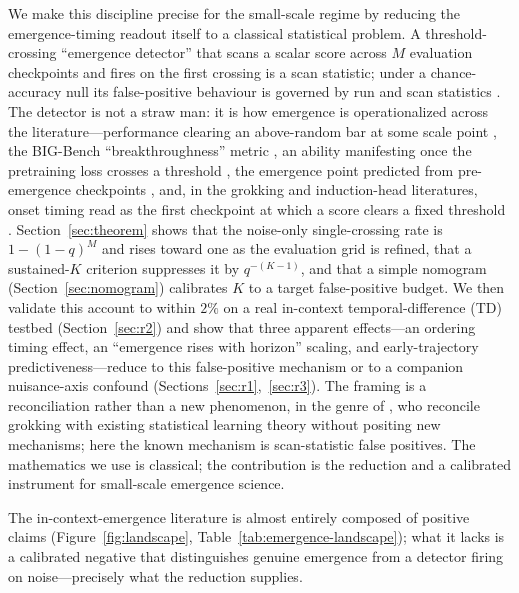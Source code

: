 \documentclass[11pt]{article}
\theoremstyle{plain}
\theoremstyle{definition}
\begin{document}
We make this discipline precise for the small-scale regime by reducing the
emergence-timing readout itself to a classical statistical problem. A threshold-crossing
``emergence detector'' that scans a scalar score across $M$ evaluation checkpoints and
fires on the first crossing is a scan statistic; under a chance-accuracy null its
false-positive behaviour is governed by run and scan statistics
\citep{feller1968,glaz2001scan,fulou2003runs}. The detector is not a straw man: it is how
emergence is operationalized across the literature---performance clearing an above-random
bar at some scale point \citep{wei2022emergent}, the BIG-Bench ``breakthroughness''
metric \citep{srivastava2022bigbench}, an ability manifesting once the pretraining loss
crosses a threshold \citep{du2024loss}, the emergence point predicted from pre-emergence
checkpoints \citep{snell2024predicting}, and, in the grokking and induction-head
literatures, onset timing read as the first checkpoint at which a score clears a fixed
threshold \citep{power2022grokking,olsson2022induction}. Section~\ref{sec:theorem} shows that the
noise-only single-crossing rate is $1-(1-q)^{M}$ and rises toward one as the evaluation
grid is refined, that a sustained-$K$ criterion suppresses it by $q^{-(K-1)}$, and that a
simple nomogram (Section~\ref{sec:nomogram}) calibrates $K$ to a target false-positive
budget. We then validate this account to within $2\%$ on a real in-context
temporal-difference (TD) testbed (Section~\ref{sec:r2}) and show that three apparent
effects---an ordering timing effect, an ``emergence rises with horizon'' scaling, and
early-trajectory predictiveness---reduce to this false-positive mechanism or to a companion
nuisance-axis confound (Sections~\ref{sec:r1},~\ref{sec:r3}). The framing is a
reconciliation rather than a new phenomenon, in the genre of \citet{oneto2026}, who
reconcile grokking with existing statistical learning theory without positing new
mechanisms; here the known mechanism is scan-statistic false positives. The mathematics we
use is classical; the contribution is the reduction and a calibrated instrument for
small-scale emergence science.

The in-context-emergence literature is almost entirely composed of positive claims
(Figure~\ref{fig:landscape}, Table~\ref{tab:emergence-landscape}); what it lacks is a calibrated negative that distinguishes
genuine emergence from a detector firing on noise---precisely what the reduction supplies.
\end{document}
